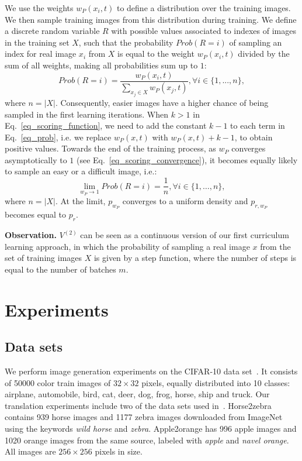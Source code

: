 \documentclass[10pt,twocolumn,letterpaper]{article}
\begin{document}
We use the weights $w_P(x_i,t)$ to define a distribution over the training images. We then sample training images from this distribution during training. We define a discrete random variable $R$ with possible values associated to indexes of images in the training set $X$, such that the probability $Prob(R=i)$ of sampling an index for real image $x_i$ from $X$ is equal to the weight $w_P(x_i,t)$ 
divided by the sum of all weights, making all probabilities sum up to $1$:
\begin{equation}\label{eq_prob}
Prob(R=i) = \frac{w_P(x_i,t)}{\sum_{x_j \in X} w_P(x_j,t)}, \forall i \in \{1,...,n\},
\end{equation}
where $n = |X|$. Consequently, easier images have a higher chance of being sampled in the first learning iterations. When $k > 1$ in Eq.~\eqref{eq_scoring_function}, we need to add the constant $k-1$ to each term in Eq.~\eqref{eq_prob}, i.e. we replace $w_P(x,t)$ with $w_P(x,t) + k - 1$, to obtain positive values. Towards the end of the training process, as $w_P$ converges asymptotically to $1$ (see Eq.~\eqref{eq_scoring_convergence}), it becomes equally likely to sample an easy or a difficult image, i.e.:
\begin{equation}
\lim_{w_P \rightarrow{1}} Prob(R=i) = \frac{1}{n}, \forall i \in \{1,\dots,n\},
\end{equation}
where $n = |X|$. At the limit, $p_{w_P}$ converges to a uniform density and $p_{r,w_P}$ becomes equal to $p_r$.

\noindent 
{\bf Observation.} $V^{(2)}$ can be seen as a continuous version of our first curriculum learning approach, in which the probability of sampling a real image $x$ from the set of training images $X$ is given by a step function, where the number of steps is equal to the number of batches $m$.

\vspace{-0.1cm}
\section{Experiments}
\label{sec_Experiments}
\vspace{-0.1cm}
\subsection{Data sets}
\vspace{-0.1cm}

We perform image generation experiments on the CIFAR-10 data set~\cite{Krizhevsky-TR-2009}. It consists of 50000 color train images of $32 \times 32$ pixels, equally distributed into 10 classes: airplane, automobile, bird, cat, deer, dog, frog, horse, ship and truck. Our translation experiments include two of the data sets used in~\cite{Zhu-ICCV-2017}. Horse2zebra contains 939 horse images and 1177 zebra images downloaded from ImageNet~\cite{Russakovsky2015} using the keywords \emph{wild horse} and \emph{zebra}. Apple2orange has 996 apple images and 1020 orange images from the same source, labeled with \emph{apple} and \emph{navel orange}. All images are $256 \times 256$ pixels in size.
\end{document}
